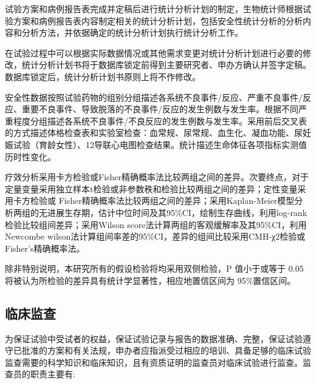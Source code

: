\documentclass[
  chinese-hans,
  letterpaper,
  DIV=11,
  numbers=noendperiod]{scrreprt}
\begin{document}
试验方案和病例报告表完成并定稿后进行统计分析计划的制定，生物统计师根据试验方案和病例报告表内容制定相关的统计分析计划，包括安全性统计分析的分析内容和分析方法，并依据确定的统计分析计划执行统计分析工作。

在试验过程中可以根据实际数据情况或其他需求变更对统计分析计划进行必要的修改，统计分析计划书将于数据库锁定前得到主要研究者、申办方确认并签字定稿。数据库锁定后，统计分析计划书原则上将不作修改。

安全性数据按照试验药物的组别分组描述各系统不良事件/反应、严重不良事件/反应、重要不良事件、导致脱落的不良事件/反应的发生例数与发生率。根据不同严重程度分组描述各系统不良事件/不良反应的发生例数与发生率。采用前后交叉表的方式描述体格检查表和实验室检查：血常规、尿常规、血生化、凝血功能、尿妊娠试验（育龄女性）、12导联心电图检查结果。统计描述生命体征各项指标实测值历时性变化。

疗效分析采用卡方检验或Fisher精确概率法比较两组之间的差异。次要终点，对于定量变量采用独立样本t检验或非参数秩和检验比较两组之间的差异；定性变量采用卡方检验或
Fisher精确概率法比较两组之间的差异；采用Kaplan-Meier模型分析两组的无进展生存期，估计中位时间及其95\%CI，绘制生存曲线，利用log-rank检验比较组间差异；采用Wilson
score法计算两组的客观缓解率及其95\%CI，利用Newcombe
wilson法计算组间率差的95\%CI，差异的组间比较采用CMH-χ2检验或Fisher's精确概率法。

除非特别说明，本研究所有的假设检验将均采用双侧检验，P 值小于或等于 0.05
将被认为所检验的差异具有统计学显著性，相应地置信区间为 95\%置信区间。

\subsection{临床监查}\label{ux4e34ux5e8aux76d1ux67e5}

为保证试验中受试者的权益，保证试验记录与报告的数据准确、完整，保证试验遵守已批准的方案和有关法规，申办者应指派受过相应的培训、具备足够的临床试验监查需要的科学知识和临床知识，且有资质证明的监查员对临床试验进行监查。监查员的职责主要有:
\end{document}
